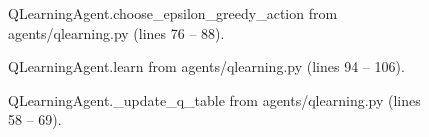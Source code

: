 \documentclass[a4paper]{article}
\begin{document}
\begin{figure}[H]

\caption{
    QLearningAgent.choose\_epsilon\_greedy\_action
    from agents/qlearning.py (lines 76 -- 88).
}
\label{code-eps}
\end{figure}

\begin{figure}[H]

\caption{
    QLearningAgent.learn
    from agents/qlearning.py (lines 94 -- 106).
}
\label{code-learn}
\end{figure}

\begin{figure}[H]

\caption{
    QLearningAgent.\_update\_q\_table
    from agents/qlearning.py (lines 58 -- 69).
}
\label{code-update}
\end{figure}
\end{document}
